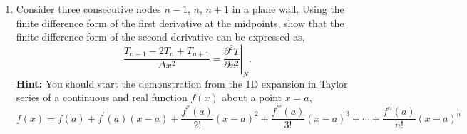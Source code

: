 \documentclass[calculator,datasheet,handbook,solutions]{exam}
\begin{document}
\begin{question}
\begin{enumerate}
    \item Consider three consecutive nodes $n-1$, $n$, $n+1$ in a plane wall. Using the finite difference form of the first derivative at the midpoints, show that the finite difference form of  the second derivative can be expressed as,
\begin{displaymath}
  \frac{T_{n-1}-2T_{n}+T_{n+1}}{\Delta x^{2}} = \left.\frac{\partial^{2} T}{\partial x^{2}}\right|_{N}.
\end{displaymath}
    {\bf Hint:} You should start the demonstration from the 1D expansion in Taylor series of a continuous and real function $f(x)$ about a point $x=a$,
    \begin{displaymath}
       f(x) = f(a) + f^{'}(a)\left(x-a\right) + \frac{f^{''}(a)}{2!}\left(x-a\right)^{2} + \frac{f^{'''}(a)}{3!}\left(x-a\right)^{3} + \cdots + \frac{f^{n}(a)}{n!}\left(x-a\right)^{n}
    \end{displaymath}


\end{enumerate}
\end{question}
\end{document}
